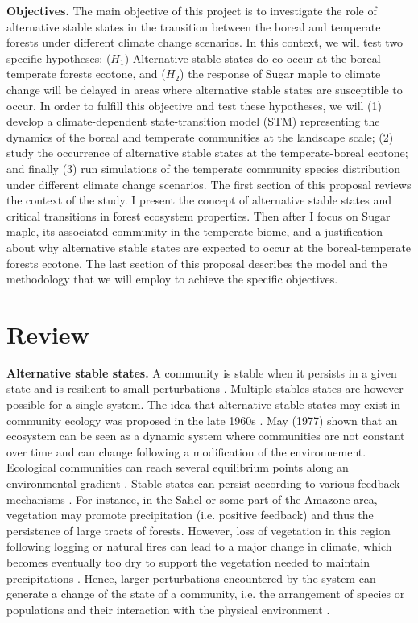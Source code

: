 \textbf{Objectives.} The main objective of this project is to investigate the
role of alternative stable states in the transition between the boreal and temperate
forests under different climate change scenarios. In this context, we will
test two specific hypotheses: ($H_1$) Alternative stable states do co-occur at
the boreal-temperate forests ecotone, and ($H_2$) the response of Sugar maple
to climate change will be delayed in areas where alternative stable states are
susceptible to occur. In order to fulfill this objective and test these
hypotheses, we will (1) develop a climate-dependent state-transition model
(STM) representing the dynamics of the boreal and temperate communities at the
landscape scale; (2) study the occurrence of alternative stable states at the
temperate-boreal ecotone; and finally (3) run simulations of the temperate
community species distribution under different climate change scenarios. The
first section of this proposal reviews the context of the study. I present
the concept of alternative stable states and critical transitions in forest
ecosystem properties. Then after I focus on Sugar maple, its associated
community in the temperate biome, and a justification about why alternative
stable states are expected to occur at the boreal-temperate forests ecotone.
The last section of this proposal describes the model and the methodology that
we will employ to achieve the specific objectives.

\section{Review} 

\textbf{Alternative stable states.} A community is stable when it persists in a
given state and is resilient to small perturbations \cite{Filbee-Dexter2013}. 
Multiple stables states are however possible for a single system. The idea that alternative
stable states may exist in community ecology was proposed in the late 1960s
\cite{Scheffer2001,Society2014a}.  May (1977) \cite{May1977} shown that an
ecosystem can be seen as a dynamic system where communities are not constant
over time and can change following a modification of the environnement.
Ecological communities can reach several equilibrium points 
along an environmental gradient \cite{May1977}. Stable states can persist
according to various feedback mechanisms \cite{Filbee-Dexter2013}. For
instance, in the Sahel or some part of the Amazone area, vegetation may
promote precipitation (i.e. positive feedback) and thus the persistence of
large tracts of forests. However, loss of vegetation  in this region following
logging or natural fires can lead to a major change in climate, which becomes
eventually too dry to support the vegetation needed to maintain precipitations
\cite{scheffer2009critical}. Hence, larger perturbations encountered by the
system can generate a change of the state of a community, i.e. the arrangement
of species or populations and their interaction with the physical environment
\cite {Filbee-Dexter2013}.\\

